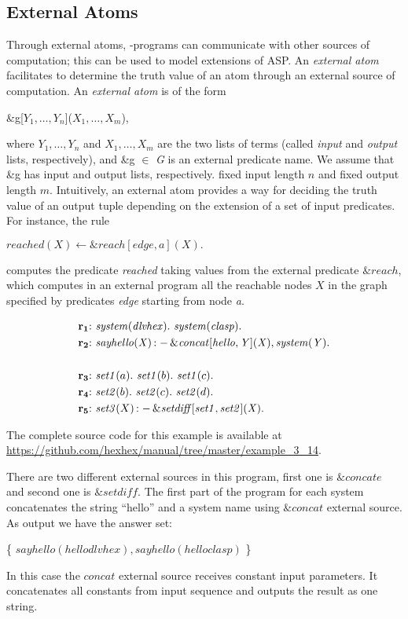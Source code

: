 \documentclass[a4paper, titlepage]{article}
\newcommand{\ext}[3]{\ensuremath{\&{\mathit{#1}}[#2](#3)}}
\DeclareMathOperator{\leftimpl}{:-}
\newcommand{\examplelink}[1]{\url{https://github.com/hexhex/manual/tree/master/#1}}
\newcommand\mycenterline[1]{\par\smallskip\centerline{#1} \smallskip}
\newcommand{\rowprefix}[1]{%
  \ensuremath{\color{black}\mathbf{#1{:}}\ }%
}
\begin{document}
\subsection{External Atoms}
\label{extatoms}
Through external atoms, \hex{}-programs can communicate 
with other sources of computation; this can be used to 
model extensions of ASP.  
An \emph{external atom} facilitates to determine the truth 
value of an atom through an external source of computation.
An \emph{external atom} is of the form
%
\mycenterline{ 
\&g[$Y_1,\dots,Y_n$]($X_1,\dots,X_m$),}
%
where $Y_1,
\dots,Y_n$ and $X_1,\dots,X_m$ are the two lists of terms 
(called \textit{input} and \textit{output} lists, 
respectively), and \&g $\in$ \textit{G} is an external 
predicate name. We assume that \&g has
input and output lists, respectively.%
fixed input length $n$ and fixed output length $m$. 
Intuitively, an 
external atom provides a way for deciding the truth value 
of an output tuple depending on the extension of a set of 
input predicates.
For instance, the rule 
%
\mycenterline{$reached(X) \leftarrow \&reach[edge,a](X).$}
%
computes the predicate \textit{reached} taking values 
from the external predicate $\&reach$, which computes in an external program
all the reachable nodes $X$ in 
the graph specified by predicates \textit{edge} starting from node \textit{a}. 
\begin{exmp}
\begin{align*}
\rowprefix{r_1}& \mathit{system}(\mathit{dlvhex}). \ 
\mathit{system}(\mathit{clasp}). \\  
\rowprefix{r_2}& \mathit{sayhello(X)} \leftimpl 
\ext{\mathit{concat}}{\mathit{hello, Y}}{\mathit{X}}, 
\mathit{system(Y).}  \\ 
\\
\rowprefix{r_3}& \mathit{set1}(a). \ \mathit{set1}(b). \ 
\mathit{set1}(c).\\
\rowprefix{r_4}& \mathit{set2}(b). \ \mathit{set2}(c). \ 
\mathit{set2}(d).\\
\rowprefix{r_5}& \mathit{set3}(X) \leftimpl 
\ext{\mathit{setdiff}}{\mathit{set1, set2}}{\mathit{X}}. 
\end{align*}
\end{exmp}
The complete source code for this example is available at \examplelink{example_3_14}.

There are two different external sources in this program, 
first one is $\mathit{\&concate}$ and second one is 
$\mathit{\&setdiff}$. The first part of the program for each 
system concatenates the string \enquote{hello} and a system 
name using $\mathit{\&concat}$ external source. As output 
we have the answer set:
%
\mycenterline{ \{ $\mathit{sayhello}(\mathit{hellodlvhex}), 
\mathit{sayhello}(\mathit{helloclasp})$ \}}
%
In this case the $\mathit{concat}$ external source receives 
constant input parameters. It concatenates all constants from input sequence and outputs the result as one string.
\end{document}
